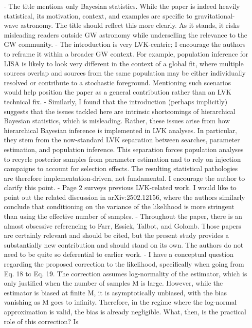 - The title mentions only Bayesian statistics. While the paper is indeed heavily
statistical, its motivation, context, and examples are specific to
gravitational-wave astronomy. The title should reflect this more clearly. As it
stands, it risks misleading readers outside GW astronomy while underselling the
relevance to the GW community.
- The introduction is very LVK-centric; I encourage the authors to reframe it
within a broader GW context. For example, population inference for LISA is
likely to look very different in the context of a global fit, where multiple
sources overlap and sources from the same population may be either individually
resolved or contribute to a stochastic foreground. Mentioning such scenarios
would help position the paper as a general contribution rather than an LVK
technical fix.
- Similarly, I found that the introduction (perhaps implicitly) suggests that
the issues tackled here are intrinsic shortcomings of hierarchical Bayesian
statistics, which is misleading. Rather, these issues arise from how
hierarchical Bayesian inference is implemented in LVK analyses. In particular,
they stem from the now-standard LVK separation between searches, parameter
estimation, and population inference. This separation forces population analyses
to recycle posterior samples from parameter estimation and to rely on injection
campaigns to account for selection effects. The resulting statistical
pathologies are therefore implementation-driven, not fundamental. I encourage
the author to clarify this point.
- Page 2 surveys previous LVK-related work. I would like to point out the
related discussion in arXiv:2502.12156, where the authors similarly conclude
that conditioning on the variance of the likelihood is more stringent than using
the effective number of samples.
- Throughout the paper, there is an almost obsessive referencing to Farr,
Essick, Talbot, and Golomb. Those papers are certainly relevant and should be
cited, but the present study provides a substantially new contribution and
should stand on its own. The authors do not need to be quite so deferential to
earlier work.
- I have a conceptual question regarding the proposed correction to the
likelihood, specifically when going from Eq. 18 to Eq. 19. The correction
assumes log-normality of the estimator, which is only justified when the number
of samples M is large. However, while the estimator is biased at finite M, it is
asymptotically unbiased, with the bias vanishing as M goes to infinity.
Therefore, in the regime where the log-normal approximation is valid, the bias
is already negligible. What, then, is the practical role of this correction? Is
